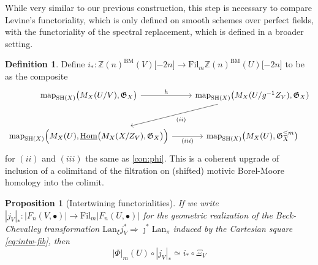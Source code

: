 \documentclass[11pt, twoside]{article}
\numberwithin{equation}{section}
\newtheorem{proposition}[equation]{Proposition}
\theoremstyle{definition}
\newtheorem{definition}[equation]{Definition}
\newcommand{\bb}[1]{\mathbb{#1}}
\newcommand{\Hom}{\mathrm{Hom}}
\newcommand{\mf}[1]{\mathfrak{#1}}
\newcommand{\map}{\mathrm{map}}
\newcommand{\fil}{\mathrm{Fil}}
\newcommand{\sh}{\mathrm{SH}}
\newcommand{\bm}{\mathrm{BM}}
\newcommand{\lan}{\mathrm{Lan}}
\begin{document}
While very similar to our previous construction, this step is necessary to compare Levine's functoriality, which is only defined on smooth schemes over perfect fields, with the functoriality of the spectral replacement, which is defined in a broader setting.

\begin{definition}\label{def:i-push}
Define \(i_* \colon \bb{Z}(n)^\bm(V) \lbrack -2n \rbrack \to \fil_m \bb{Z}(n)^\bm(U) \lbrack -2n \rbrack\) to be as the composite 
\[\begin{tikzcd} [row sep = large]
\map_{\sh(X)}\big(M_X(U/V), \mf{G}_X\big) \ar[r, "h"] & \map_{\sh(X)}\big(M_X(U/g^{- 1} Z_V), \mf{G}_X) \ar[dl, "(ii)"]\\
\map_{\sh(X)} \Big(M_X(U), \underline{\Hom}\big(M_X(X/Z_V), \mf{G}_X\big)\Big) \ar[r, "(iii)", swap] & \map_{\sh(X)}\big(M_X(U), \mf{G}_X^{\leq m}\big)
\end{tikzcd}\]
for \((ii)\) and \((iii)\) the same as \ref{con:phi}. This is a coherent upgrade of inclusion of a colimitand of the filtration on (shifted) motivic Borel-Moore homology into the colimit.
\end{definition}

\begin{proposition}[Intertwining functorialities]\label{prop:int-fun}
If we write \(|j_V|_* \colon |F_n(V, \bullet)| \to \fil_m |F_n(U, \bullet)|\) for the geometric realization of the Beck-Chevalley transformation \(\lan_\xi j_V^* \Longrightarrow \jmath^* \lan_\pi\) induced by the Cartesian square \eqref{eq:intw-fib}, then 
\[|\Phi|_m(U) \circ |j_V|_* \simeq i_* \circ \Xi_V\]
\end{proposition}

\end{document}
